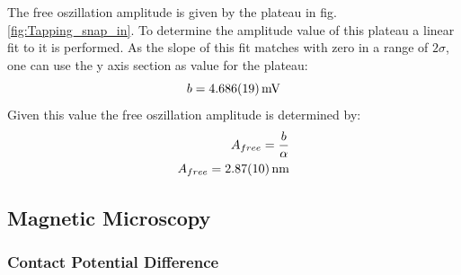 \documentclass[%
 reprint,
amsmath,amssymb,
pra,
]{revtex4-1}
\begin{document}
The free oszillation amplitude is given by the plateau in fig. \ref{fig:Tapping_snap_in}. To determine the amplitude value of this plateau a linear fit to it is performed. As the slope of this fit matches with zero in a range of $2 \sigma$, one can use the y axis section as value for the plateau:
\begin{equation*}
b = \SI{4.686 \pm 0.019}{mV}
\end{equation*}
Given this value the free oszillation amplitude is determined by:
\begin{equation*}
\begin{aligned}
A_{free} = \dfrac{b}{\alpha}\\
A_{free} = \SI{2.87 \pm 0.10}{nm}
\end{aligned}
\end{equation*}

\subsection{Magnetic Microscopy}

\subsubsection{Contact Potential Difference}
\end{document}

